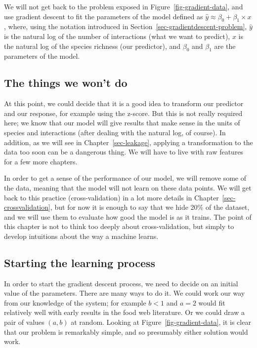 \documentclass[
  letterpaper,
]{scrbook}
\begin{document}
We will not get back to the problem exposed in
Figure~\ref{fig-gradient-data}, and use gradient descent to fit the
parameters of the model defined as
\(\hat y \approx \beta_0 + \beta_1 \times x\), where, using the notation
introduced in Section~\ref{sec-gradientdescent-problem}, \(\hat y\) is
the natural log of the number of interactions (what we want to predict),
\(x\) is the natural log of the species richness (our predictor), and
\(\beta_0\) and \(\beta_1\) are the parameters of the model.

\subsection{The things we won't do}\label{the-things-we-wont-do}

At this point, we could decide that it is a good idea to transform our
predictor and our response, for example using the z-score. But this is
not really required here; we know that our model will give results that
make sense in the units of species and interactions (after dealing with
the natural log, of course). In addition, as we will see in
Chapter~\ref{sec-leakage}, applying a transformation to the data too
soon can be a dangerous thing. We will have to live with raw features
for a few more chapters.

In order to get a sense of the performance of our model, we will remove
some of the data, meaning that the model will not learn on these data
points. We will get back to this practice (cross-validation) in a lot
more details in Chapter~\ref{sec-crossvalidation}, but for now it is
enough to say that we hide 20\% of the dataset, and we will use them to
evaluate how good the model is as it trains. The point of this chapter
is not to think too deeply about cross-validation, but simply to develop
intuitions about the way a machine learns.

\subsection{Starting the learning
process}\label{starting-the-learning-process}

In order to start the gradient descent process, we need to decide on an
initial value of the parameters. There are many ways to do it. We could
work our way from our knowledge of the system; for example \(b < 1\) and
\(a = 2\) would fit relatively well with early results in the food web
literature. Or we could draw a pair of values \((a, b)\) at random.
Looking at Figure~\ref{fig-gradient-data}, it is clear that our problem
is remarkably simple, and so presumably either solution would work.
\end{document}
